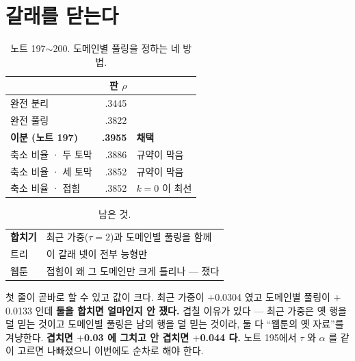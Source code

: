 \documentclass[10pt]{article}
\begin{document}
\section{갈래를 닫는다}

\begin{table}[t]
\centering\tsize
\caption{노트 197$\sim$200. 도메인별 풀링을 정하는 네 방법.}
\begin{tabular}{lrl}
\toprule
& 판 $\rho$ & \\
\midrule
완전 분리 & .3445 & \\
완전 풀링 & .3822 & \\
\textbf{이분 (노트 197)} & \textbf{.3955} & \textbf{채택} \\
축소 비율 · 두 토막 & .3886 & 규약이 막음 \\
축소 비율 · 세 토막 & .3852 & 규약이 막음 \\
축소 비율 · 접힘 & .3852 & $k{=}0$ 이 최선 \\
\bottomrule
\end{tabular}
\end{table}



\begin{table}[t]
\centering\tsize
\caption{남은 것.}
\begin{tabular}{ll}
\toprule
\textbf{합치기} & 최근 가중($\tau{=}2$)과 도메인별 풀링을 함께 \\
트리 & 이 갈래 넷이 전부 능형만 \\
웹툰 & 접힘이 왜 그 도메인만 크게 틀리나 --- 쟀다 \\
\bottomrule
\end{tabular}
\end{table}

첫 줄이 곧바로 할 수 있고 값이 크다. 최근 가중이 $+$0.0304 였고 도메인별
풀링이 $+$0.0133 인데 \textbf{둘을 합치면 얼마인지 안 쟀다.} 겹칠 이유가
있다 --- 최근 가중은 옛 행을 덜 믿는 것이고 도메인별 풀링은 남의 행을 덜
믿는 것이라, 둘 다 ``웹툰의 옛 자료''를 겨냥한다. \textbf{겹치면 $+$0.03
에 그치고 안 겹치면 $+$0.044 다.} 노트 195에서 $\tau$ 와 $\alpha$ 를 같이
고르면 나빠졌으니 이번에도 순차로 해야 한다.
\end{document}
